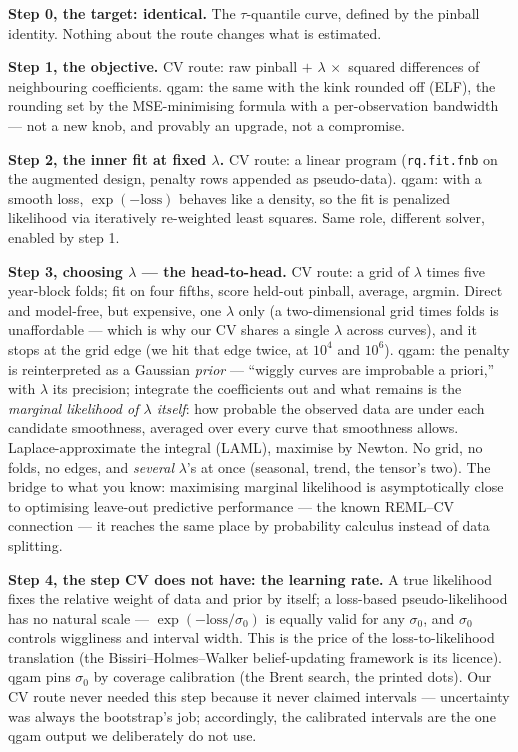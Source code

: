 \documentclass[11pt]{article}
\newcommand{\code}[1]{\texttt{#1}}
\begin{document}
\textbf{Step 0, the target: identical.} The $\tau$-quantile curve, defined
by the pinball identity. Nothing about the route changes what is estimated.

\textbf{Step 1, the objective.} CV route: raw pinball $+$
$\lambda\,\times$ squared differences of neighbouring coefficients. qgam:
the same with the kink rounded off (ELF), the rounding set by the
MSE-minimising formula with a per-observation bandwidth --- not a new knob,
and provably an upgrade, not a compromise.

\textbf{Step 2, the inner fit at fixed $\lambda$.} CV route: a linear
program (\code{rq.fit.fnb} on the augmented design, penalty rows appended
as pseudo-data). qgam: with a smooth loss, $\exp(-\mathrm{loss})$ behaves
like a density, so the fit is penalized likelihood via iteratively
re-weighted least squares. Same role, different solver, enabled by step 1.

\textbf{Step 3, choosing $\lambda$ --- the head-to-head.} CV route: a grid
of $\lambda$ times five year-block folds; fit on four fifths, score
held-out pinball, average, argmin. Direct and model-free, but expensive,
one $\lambda$ only (a two-dimensional grid times folds is unaffordable ---
which is why our CV shares a single $\lambda$ across curves), and it stops
at the grid edge (we hit that edge twice, at $10^4$ and $10^6$). qgam: the
penalty is reinterpreted as a Gaussian \emph{prior} --- ``wiggly curves are
improbable a priori,'' with $\lambda$ its precision; integrate the
coefficients out and what remains is the \emph{marginal likelihood of
$\lambda$ itself}: how probable the observed data are under each candidate
smoothness, averaged over every curve that smoothness allows.
Laplace-approximate the integral (LAML), maximise by Newton. No grid, no
folds, no edges, and \emph{several} $\lambda$'s at once (seasonal, trend,
the tensor's two). The bridge to what you know: maximising marginal
likelihood is asymptotically close to optimising leave-out predictive
performance --- the known REML--CV connection --- it reaches the same place
by probability calculus instead of data splitting.

\textbf{Step 4, the step CV does not have: the learning rate.} A true
likelihood fixes the relative weight of data and prior by itself; a
loss-based pseudo-likelihood has no natural scale ---
$\exp(-\mathrm{loss}/\sigma_0)$ is equally valid for any $\sigma_0$, and
$\sigma_0$ controls wiggliness and interval width. This is the price of the
loss-to-likelihood translation (the Bissiri--Holmes--Walker belief-updating
framework is its licence). qgam pins $\sigma_0$ by coverage calibration
(the Brent search, the printed dots). Our CV route never needed this step
because it never claimed intervals --- uncertainty was always the
bootstrap's job; accordingly, the calibrated intervals are the one qgam
output we deliberately do not use.
\end{document}
